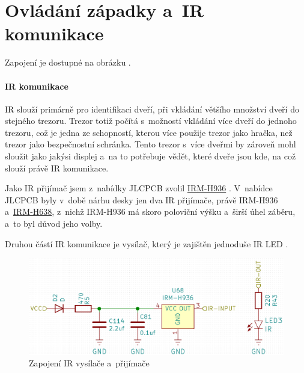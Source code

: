 \section{Ovládání západky a~IR komunikace}

Zapojení je dostupné na obrázku .

\paragraph{IR komunikace}
IR slouží primárně pro identifikaci dveří, při vkládání většího množství dveří do stejného trezoru.
Trezor totiž počítá s~možností vkládání více dveří do jednoho trezoru, což je jedna ze schopností, kterou více použije trezor jako hračka, než trezor jako bezpečnostní schránka.
Tento trezor s~více dveřmi by zároveň mohl sloužit jako jakýsi displej a~na to potřebuje vědět, které dveře jsou kde, na což slouží právě IR komunikace. %

Jako IR přijímač jsem z~nabídky JLCPCB \parencite{JLCPCB} zvolil \href{https://datasheet.lcsc.com/szlcsc/1912111437_Everlight-Elec-IRM-H936-TR2_C264266.pdf}{IRM-H936} \parencite{irm-h936}. 
V~nabídce JLCPCB byly v~době nárhu desky jen dva IR při\-jí\-ma\-če, právě IRM-H936 a~\href{https://datasheet.lcsc.com/szlcsc/2010221806_Everlight-Elec-IRM-H638T-TR2-DX_C390031.pdf}{IRM-H638},
z~nichž IRM-H936 má skoro poloviční výšku a~širší úhel záběru, a~to byl důvod jeho volby.

Druhou částí IR komunikace je vysílač, který je zajištěn jednoduše IR LED \parencite{ir19-21c/tr8}.

\begin{figure}[htbp]
    \centering
    \includegraphics[width=\textwidth]{kapitoly/obrazky/E4/ir_motor_enkoder/IR.png}
    \caption{Zapojení IR vysílače a~přijímače}
    \label{fig:E4-ir}
\end{figure}

\newpage

